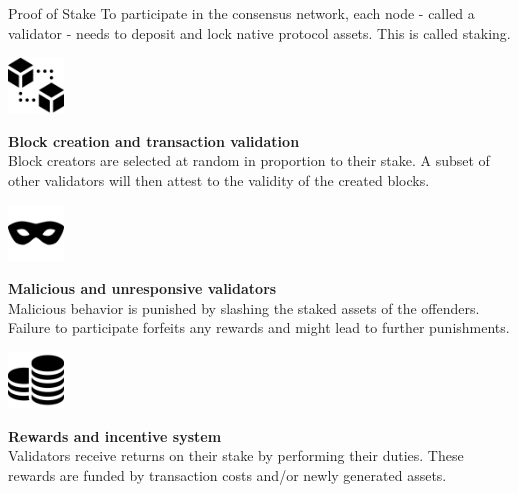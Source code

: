\documentclass[]{beamer}
\begin{document}
	\begin{frame}{Proof of Stake}
		\small
		To participate in the consensus network, each node - called a validator - needs to \color{focus} deposit and lock native protocol assets\color{black}. This is called staking.
		
		\pause
		\vspace{1.5 em}
		\begin{minipage}{0.2\textwidth}
			\begin{center}
				\includegraphics[height=4em]{../assets/images/blocks}
			\end{center}
		\end{minipage}
		\begin{minipage}{0.7\textwidth}
			\textbf{Block creation and transaction validation} \\
			Block creators are selected at random in proportion to their stake. A subset of other validators will then attest to the validity of the created blocks.
		\end{minipage}
	
		\pause
		\vspace{1.5 em}
		\begin{minipage}{0.2\textwidth}
			\begin{center}
				\includegraphics[height=4em]{../assets/images/mask}
			\end{center}
		\end{minipage}
		\begin{minipage}{0.7\textwidth}
			\textbf{Malicious and unresponsive validators} \\
			Malicious behavior is punished by slashing the staked assets of the offenders. Failure to participate forfeits any rewards and might lead to further punishments.
		\end{minipage}
	
		\pause
		\vspace{1.5 em}
		\begin{minipage}{0.2\textwidth}
			\begin{center}
				\includegraphics[height=4em]{../assets/images/coin-stack}
			\end{center}
		\end{minipage}
		\begin{minipage}{0.7\textwidth}
			\textbf{Rewards and incentive system} \\
			Validators receive returns on their stake by performing their duties. These rewards are funded by transaction costs and/or newly generated assets.
		\end{minipage}
	\end{frame}
	
\end{document}
